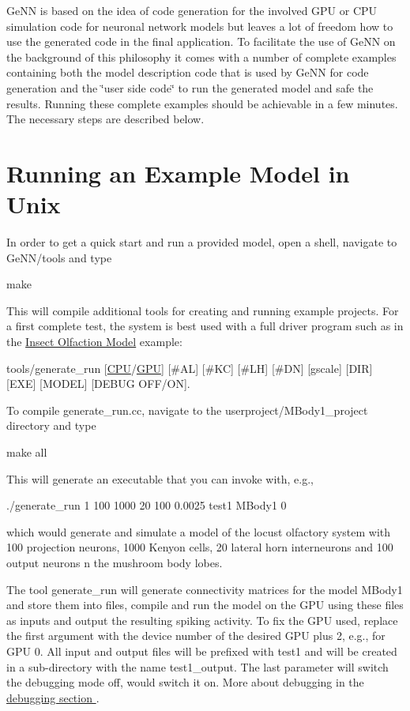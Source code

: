 Ge\+N\+N is based on the idea of code generation for the involved G\+P\+U or C\+P\+U simulation code for neuronal network models but leaves a lot of freedom how to use the generated code in the final application. To facilitate the use of Ge\+N\+N on the background of this philosophy it comes with a number of complete examples containing both the model description code that is used by Ge\+N\+N for code generation and the \char`\"{}user side code\char`\"{} to run the generated model and safe the results. Running these complete examples should be achievable in a few minutes. The necessary steps are described below.\hypertarget{Quickstart_sec_unix_quick}{}\section{Running an Example Model in Unix}\label{Quickstart_sec_unix_quick}
In order to get a quick start and run a provided model, open a shell, navigate to {\ttfamily Ge\+N\+N/tools} and type 
\begin{DoxyCode}
make
\end{DoxyCode}
 This will compile additional tools for creating and running example projects. For a first complete test, the system is best used with a full driver program such as in the \hyperlink{Examples_sec_ex_mbody}{Insect Olfaction Model} example\+: 
\begin{DoxyCode}
tools/generate\_run [\hyperlink{modelSpec_8h_ad703205f9a4d4bb6af9c25257c23ce6d}{CPU}/\hyperlink{modelSpec_8h_a39cb9803524b6f3b783344b2f89867b4}{GPU}] [#AL] [#KC] [#LH] [#DN] [gscale] [DIR] [EXE] [MODEL] [DEBUG OFF/ON]. 
\end{DoxyCode}
 To compile {\ttfamily generate\+\_\+run.\+cc}, navigate to the {\ttfamily userproject/\+M\+Body1\+\_\+project} directory and type 
\begin{DoxyCode}
make all
\end{DoxyCode}
 This will generate an executable that you can invoke with, e.\+g., 
\begin{DoxyCode}
./generate\_run 1 100 1000 20 100 0.0025 test1 MBody1 0 
\end{DoxyCode}
 which would generate and simulate a model of the locust olfactory system with 100 projection neurons, 1000 Kenyon cells, 20 lateral horn interneurons and 100 output neurons n the mushroom body lobes.

The tool generate\+\_\+run will generate connectivity matrices for the model {\ttfamily M\+Body1} and store them into files, compile and run the model on the G\+P\+U using these files as inputs and output the resulting spiking activity. To fix the G\+P\+U used, replace the first argument {} with the device number of the desired G\+P\+U plus 2, e.\+g., {} for G\+P\+U 0. All input and output files will be prefixed with {\ttfamily test1} and will be created in a sub-\/directory with the name {\ttfamily test1\+\_\+output}. The last parameter {} will switch the debugging mode off, {} would switch it on. More about debugging in the \hyperlink{}{debugging section }.

